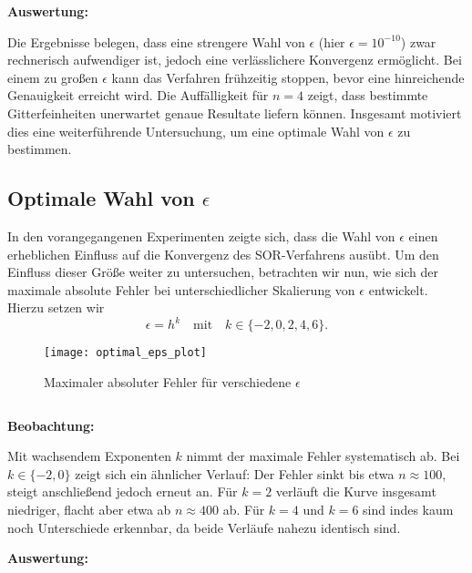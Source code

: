 \documentclass{scrartcl}
\newenvironment{code}{\captionsetup{type=listing}}{}
\begin{document}
\textbf{Auswertung:}

Die Ergebnisse belegen, dass eine strengere Wahl von \(\epsilon\) (hier
\(\epsilon = 10^{-10}\)) zwar rechnerisch aufwendiger ist, jedoch eine
verlässlichere Konvergenz ermöglicht. Bei einem zu großen \(\epsilon\) kann das
Verfahren frühzeitig stoppen, bevor eine hinreichende Genauigkeit erreicht
wird. Die Auffälligkeit für \(n = 4\) zeigt, dass bestimmte Gitterfeinheiten
unerwartet genaue Resultate liefern können. Insgesamt motiviert dies eine
weiterführende Untersuchung, um eine optimale Wahl von \(\epsilon\) zu
bestimmen.

\subsection{Optimale Wahl von \(\epsilon\)}\label{sec:optimal_epsilon}

In den vorangegangenen Experimenten zeigte sich, dass die Wahl von \(\epsilon\)
einen erheblichen Einfluss auf die Konvergenz des SOR-Verfahrens ausübt. Um den
Einfluss dieser Größe weiter zu untersuchen, betrachten wir nun, wie sich der
maximale absolute Fehler bei unterschiedlicher Skalierung von \(\epsilon\)
entwickelt. Hierzu setzen wir
\[
    \epsilon = h^k \quad \text{mit} \quad k \in \{ -2, 0, 2, 4, 6 \}.
\]

\begin{figure}[H]
    \centering
    \texttt{[image: optimal\_eps\_plot]}
    \caption{Maximaler absoluter Fehler für verschiedene \(\epsilon\)}
    \label{fig:optimal_epsilon}
\end{figure}

\begin{code}
    \label{code:optimal_epsilon}
    \inputminted[firstline=19, lastline=24]{bash}{figures/generate.sh}
\end{code}

\textbf{Beobachtung:}

Mit wachsendem Exponenten \(k\) nimmt der maximale Fehler systematisch ab. Bei
\(k \in \{-2, 0\}\) zeigt sich ein ähnlicher Verlauf: Der Fehler sinkt bis etwa
\(n \approx 100\), steigt anschließend jedoch erneut an. Für \(k = 2\) verläuft
die Kurve insgesamt niedriger, flacht aber etwa ab \(n \approx 400\) ab. Für
\(k = 4\) und \(k = 6\) sind indes kaum noch Unterschiede erkennbar, da beide
Verläufe nahezu identisch sind.

\textbf{Auswertung:}
\end{document}
